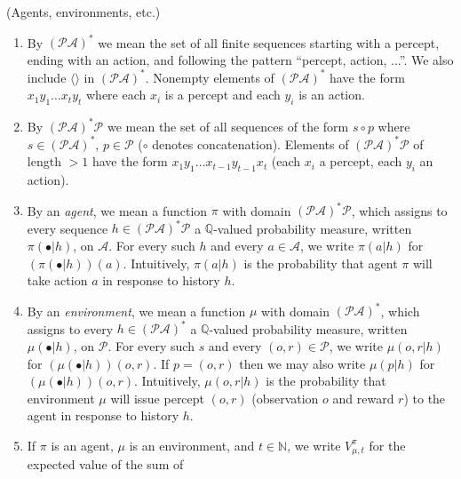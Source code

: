 \documentclass[runningheads]{llncs}
\begin{document}
\begin{definition}
\label{omnibusdefn}
    (Agents, environments, etc.)
    \begin{enumerate}
        \item
        By $(\mathcal P\mathcal A)^*$ we mean the set of
        all finite sequences
        starting with a percept, ending with an action,
        and following the pattern ``percept, action, ...''.
        We also include $\langle\rangle$ in $(\mathcal P\mathcal A)^*$.
        Nonempty elements of $(\mathcal P\mathcal A)^*$ have the
        form $x_1y_1\ldots x_ty_t$ where each $x_i$ is a percept and
        each $y_i$ is an action.
        \item
        By $(\mathcal P\mathcal A)^* \mathcal P$
        we mean the set of all sequences of the form $s\circ p$ where
        $s\in (\mathcal P\mathcal A)^*$, $p\in\mathcal P$
        ($\circ$ denotes concatenation).
        Elements of $(\mathcal P\mathcal A)^* \mathcal P$
        of length $>1$ have the form
        $x_1y_1\ldots x_{t-1}y_{t-1}x_t$
        (each $x_i$ a percept, each $y_i$ an action).
        \item
        By an \emph{agent}, we mean a function $\pi$
        with domain $(\mathcal P\mathcal A)^* \mathcal P$,
        which assigns to every sequence
        $h\in (\mathcal P\mathcal A)^* \mathcal P$ a
        $\mathbb Q$-valued probability measure,
        written $\pi(\bullet|h)$, on $\mathcal A$.
        For every such $h$ and every $a\in\mathcal A$,
        we write $\pi(a|h)$ for $(\pi(\bullet|h))(a)$.
        Intuitively, $\pi(a|h)$ is the probability that agent $\pi$
        will take action $a$ in response to history $h$.
        \item
        By an \emph{environment}, we mean a function $\mu$
        with domain $(\mathcal P\mathcal A)^*$,
        which assigns to every
        $h\in (\mathcal P\mathcal A)^*$
        a $\mathbb Q$-valued probability measure,
        written $\mu(\bullet|h)$,
        on $\mathcal P$.
        For every such $s$ and every $(o,r)\in\mathcal P$,
        we write $\mu(o,r|h)$ for $(\mu(\bullet|h))(o,r)$.
        If $p=(o,r)$ then we may also write $\mu(p|h)$ for
        $(\mu(\bullet|h))(o,r)$.
        Intuitively, $\mu(o,r|h)$ is the probability that environment
        $\mu$ will issue percept $(o,r)$ (observation $o$ and reward $r$)
        to the agent in response to history $h$.
        \item
        If $\pi$ is an agent, $\mu$ is an environment, and $t\in\mathbb N$,
        we write $V^\pi_{\mu,t}$ for the expected value of the sum of

\end{enumerate}
\end{definition}
\end{document}
